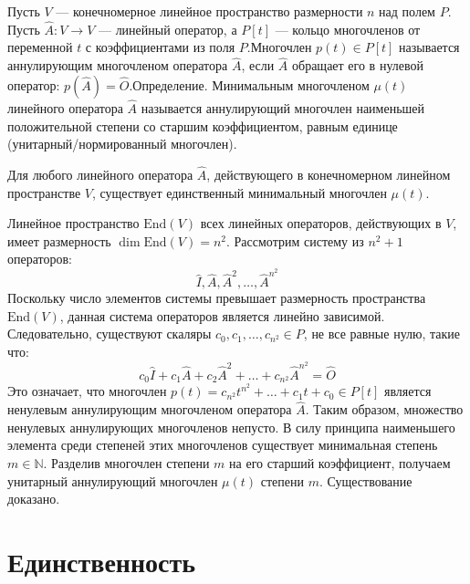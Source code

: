 \documentclass[14pt]{extreport}
\begin{document}
    \begin{defbox}
        Пусть $V$ — конечномерное линейное пространство размерности $n$ над полем $P$. Пусть $\hat{A}: V \to V$ — линейный оператор, а $P[t]$ — кольцо многочленов от переменной $t$ с коэффициентами из поля $P$.Многочлен $p(t) \in P[t]$ называется аннулирующим многочленом оператора $\hat{A}$, если $\hat{A}$ обращает его в нулевой оператор: $p(\hat{A}) = \hat{O}$.Определение. Минимальным многочленом $\mu(t)$ линейного оператора $\hat{A}$ называется аннулирующий многочлен наименьшей положительной степени со старшим коэффициентом, равным единице (унитарный/нормированный многочлен).
    \end{defbox}

    \begin{thbox}
        Для любого линейного оператора $\hat{A}$, действующего в конечномерном линейном пространстве $V$, существует единственный минимальный многочлен $\mu(t)$.
    \end{thbox}
    
    \begin{prbox}
        Линейное пространство $\text{End}(V)$ всех линейных операторов, действующих в $V$, имеет размерность $\dim \text{End}(V) = n^2$. Рассмотрим систему из $n^2 + 1$ операторов:$$\hat{I}, \hat{A}, \hat{A}^2, \dots, \hat{A}^{n^2}$$Поскольку число элементов системы превышает размерность пространства $\text{End}(V)$, данная система операторов является линейно зависимой. Следовательно, существуют скаляры $c_0, c_1, \dots, c_{n^2} \in P$, не все равные нулю, такие что:$$c_0 \hat{I} + c_1 \hat{A} + c_2 \hat{A}^2 + \dots + c_{n^2} \hat{A}^{n^2} = \hat{O}$$Это означает, что многочлен $p(t) = c_{n^2} t^{n^2} + \dots + c_1 t + c_0 \in P[t]$ является ненулевым аннулирующим многочленом оператора $\hat{A}$. Таким образом, множество ненулевых аннулирующих многочленов непусто. В силу принципа наименьшего элемента среди степеней этих многочленов существует минимальная степень $m \in \mathbb{N}$. Разделив многочлен степени $m$ на его старший коэффициент, получаем унитарный аннулирующий многочлен $\mu(t)$ степени $m$. Существование доказано.
    \end{prbox}

    \section{Единственность}
\end{document}

